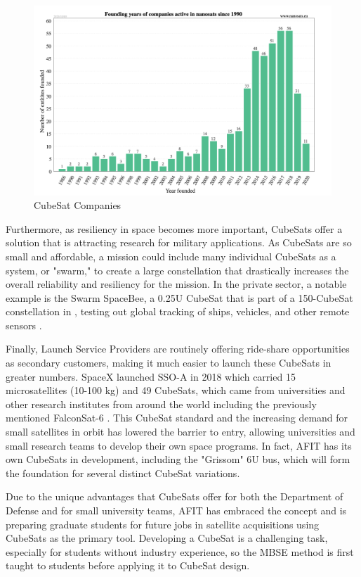 \begin{figure}[H]
    \centering
    \includegraphics[width=\textwidth]{Thesis/Literature_Review/Lit Review Figures/CubeSat companies.png}
    \caption{CubeSat Companies}
    \label{fig:CubeSat Companies}
\end{figure}

Furthermore, as resiliency in space becomes more important, CubeSats offer a solution that is attracting research for military applications. As CubeSats are so small and affordable, a mission could include many individual CubeSats as a system, or "swarm," to create a large constellation that drastically increases the overall reliability and resiliency for the mission. In the private sector, a notable example is the Swarm SpaceBee, a 0.25U CubeSat that is part of a 150-CubeSat constellation in , testing out global  tracking of ships, vehicles, and other remote sensors \citep{Harris2019}. 

Finally, Launch Service Providers are routinely offering ride-share opportunities as secondary customers, making it much easier to launch these CubeSats in greater numbers. SpaceX launched SSO-A in 2018 which carried 15 microsatellites (10-100 kg) and 49 CubeSats, which came from universities and other research institutes from around the world including the previously mentioned FalconSat-6 \citep{eoPortal}. This CubeSat standard and the increasing demand for small satellites in orbit has lowered the barrier to entry, allowing universities and small research teams to develop their own space programs. In fact, AFIT has its own CubeSats in development, including the "Grissom" 6U bus, which will form the foundation for several distinct CubeSat variations.

Due to the unique advantages that CubeSats offer for both the Department of Defense and for small university teams, AFIT has embraced the concept and is preparing graduate students for future jobs in satellite acquisitions using CubeSats as the primary tool. Developing a CubeSat is a challenging task, especially for students without industry experience, so the MBSE method is first taught to students before applying it to CubeSat design.





